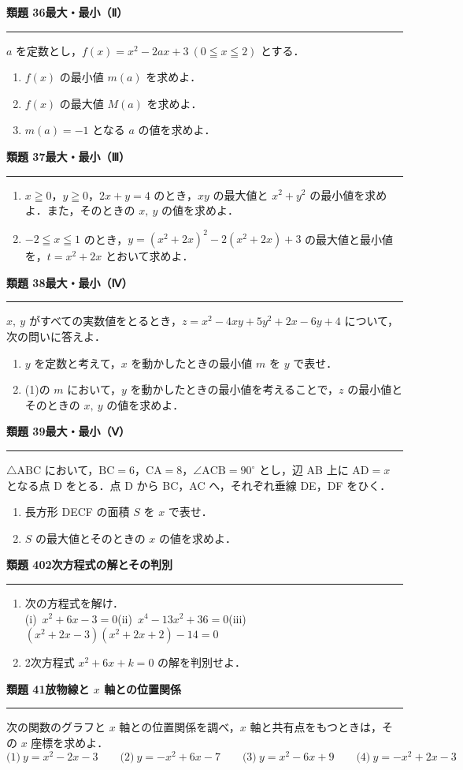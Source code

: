 \documentclass[a4paper,11pt]{ltjsarticle}
\newcommand{\mon}[2]{\Needspace{7\baselineskip}\vspace{10pt}%
  {\sffamily\bfseries 類題 #1\quad #2\par}\vspace{2pt}\hrule\vspace{4pt}}
\begin{document}
\mon{36}{最大・最小（Ⅱ）}
$a$ を定数とし，$f(x)=x^2-2ax+3\ (0\leqq x\leqq2)$ とする．
\begin{enumerate}
\item $f(x)$ の最小値 $m(a)$ を求めよ．
\item $f(x)$ の最大値 $M(a)$ を求めよ．
\item $m(a)=-1$ となる $a$ の値を求めよ．
\end{enumerate}

\mon{37}{最大・最小（Ⅲ）}
\begin{enumerate}
\item $x\geqq0$，$y\geqq0$，$2x+y=4$ のとき，$xy$ の最大値と $x^2+y^2$ の最小値を求めよ．また，そのときの $x,\ y$ の値を求めよ．
\item $-2\leqq x\leqq1$ のとき，$y=(x^2+2x)^2-2(x^2+2x)+3$ の最大値と最小値を，$t=x^2+2x$ とおいて求めよ．
\end{enumerate}

\mon{38}{最大・最小（Ⅳ）}
$x,\ y$ がすべての実数値をとるとき，$z=x^2-4xy+5y^2+2x-6y+4$ について，次の問いに答えよ．
\begin{enumerate}
\item $y$ を定数と考えて，$x$ を動かしたときの最小値 $m$ を $y$ で表せ．
\item (1)の $m$ において，$y$ を動かしたときの最小値を考えることで，$z$ の最小値とそのときの $x,\ y$ の値を求めよ．
\end{enumerate}

\mon{39}{最大・最小（Ⅴ）}
$\triangle\mathrm{ABC}$ において，$\mathrm{BC}=6$，$\mathrm{CA}=8$，$\angle\mathrm{ACB}=90^\circ$ とし，辺 AB 上に $\mathrm{AD}=x$ となる点 D をとる．点 D から BC，AC へ，それぞれ垂線 DE，DF をひく．
\begin{enumerate}
\item 長方形 DECF の面積 $S$ を $x$ で表せ．
\item $S$ の最大値とそのときの $x$ の値を求めよ．
\end{enumerate}

\mon{40}{2次方程式の解とその判別}
\begin{enumerate}
\item 次の方程式を解け．\\
(i)\ $x^2+6x-3=0$\qquad (ii)\ $x^4-13x^2+36=0$\qquad (iii)\ $(x^2+2x-3)(x^2+2x+2)-14=0$
\item 2次方程式 $x^2+6x+k=0$ の解を判別せよ．
\end{enumerate}

\mon{41}{放物線と $x$ 軸との位置関係}
次の関数のグラフと $x$ 軸との位置関係を調べ，$x$ 軸と共有点をもつときは，その $x$ 座標を求めよ．
\[\text{(1)}\ y=x^2-2x-3\qquad\text{(2)}\ y=-x^2+6x-7\qquad\text{(3)}\ y=x^2-6x+9\qquad\text{(4)}\ y=-x^2+2x-3\]
\end{document}
